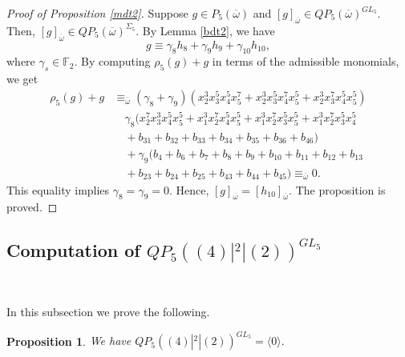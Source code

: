 \documentclass[reqno]{amsart}
\theoremstyle{plain}
\theoremstyle{definition}
\theoremstyle{plain}
\newtheorem{props}[thms]{Proposition}
\theoremstyle{definition}
\numberwithin{equation}{section}
\begin{document}
\begin{proof}[Proof of Proposition \ref{mdt2}] Suppose $g \in P_5(\overline{\omega})$ and $[g]_{\overline{\omega}} \in QP_5(\overline{\omega})^{GL_5}$. Then, $[g]_{\overline{\omega}} \in QP_5(\overline{\omega})^{\Sigma_5}$. By Lemma \ref{bdt2}, we have 
$$ g \equiv \gamma_{8}h_8 + \gamma_{9}h_9 + \gamma_{10}h_{10},$$
where $\gamma_s \in \mathbb F_2$. By computing $\rho_5(g)+g$ in terms of the admissible monomials, we get
\begin{align*}
\rho_5(g)+g &\equiv_{\overline{\omega}}  (\gamma_8+\gamma_9)(x_2^3x_3^5x_4^5x_5^7 + x_2^3x_3^5x_4^7x_5^5 + x_2^3x_3^7x_4^5x_5^5)\\ 
&\quad \gamma_8\big(x_2^{7}x_3^{3}x_4^{5}x_5^{5} + x_1^{3}x_2^{7}x_4^{5}x_5^{5} + x_1^{3}x_2^{7}x_3^{5}x_5^{5} + x_1^{3}x_2^{7}x_3^{5}x_4^{5}\\ &\quad + b_{31} + b_{32} + b_{33} + b_{34} + b_{35} + b_{36} + b_{46}\big)\\
&\quad +\gamma_9\big(b_{4} + b_{6} + b_{7} + b_{8} + b_{9} + b_{10} + b_{11} + b_{12} + b_{13}\\ &\quad + b_{23} + b_{24} + b_{25} + b_{43} + b_{44} + b_{45}\big)
 \equiv_{\overline{\omega}} 0.
\end{align*}
This equality implies $\gamma_8 = \gamma_9 = 0$. Hence, $[g]_{\overline{\omega}} = [h_{10}]_{\overline{\omega}}$. The proposition is proved.
\end{proof}

\subsection{Computation of $QP_5((4)|^{2}|(2))^{GL_5}$}\

\smallskip
In this subsection we prove the following.

\begin{props}\label{mdt3} We have 
$QP_5((4)|^2|(2))^{GL_5} = \langle 0\rangle.$
\end{props}
\end{document}

